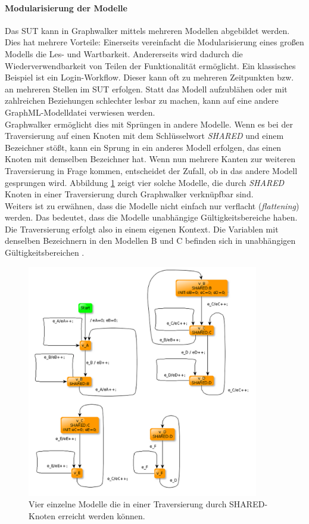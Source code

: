 \paragraph{Modularisierung der Modelle}
\label{sec:graphwalker_modularisierung}
Das \Gls{SUT} kann in Graphwalker mittels mehreren Modellen abgebildet werden. Dies hat mehrere Vorteile: Einerseits vereinfacht die Modularisierung eines großen Modells die Les- und Wartbarkeit. Andererseits wird dadurch die Wiederverwendbarkeit von Teilen der Funktionalität ermöglicht. Ein klassisches Beispiel ist ein Login-Workflow. Dieser kann oft zu mehreren Zeitpunkten bzw. an mehreren Stellen im \Gls{SUT} erfolgen. Statt das Modell aufzublähen oder mit zahlreichen Beziehungen schlechter lesbar zu machen, kann auf eine andere GraphML-Modelldatei verwiesen werden.\\
Graphwalker ermöglicht dies mit Sprüngen in andere Modelle. Wenn es bei der Traversierung auf einen Knoten mit dem Schlüsselwort \textit{SHARED} und einem Bezeichner stößt, kann ein Sprung in ein anderes Modell erfolgen, das einen Knoten mit demselben Bezeichner hat. Wenn nun mehrere Kanten zur weiteren Traversierung in Frage kommen, entscheidet der Zufall, ob in das andere Modell gesprungen wird. Abbildung \ref{fig:gw_multiple_models} zeigt vier solche Modelle, die durch \textit{SHARED} Knoten in einer Traversierung durch Graphwalker verknüpfbar sind.\\
Weiters ist zu erwähnen, dass die Modelle nicht einfach nur verflacht (\textit{flattening}) werden. Das bedeutet, dass die Modelle unabhängige Gültigkeitsbereiche haben. Die Traversierung erfolgt also in einem eigenen Kontext. Die Variablen mit denselben Bezeichnern in den Modellen B und C befinden sich in unabhängigen Gültigkeitsbereichen \cite{_graphwalker_2015}.

\begin{figure}[h] 
  \centering
     \includegraphics[width=0.9\textwidth]{figures/gw_multiple_models.png}
  \caption{Vier einzelne Modelle die in einer Traversierung durch SHARED-Knoten erreicht werden können.}
  \label{fig:gw_multiple_models}
\end{figure}

